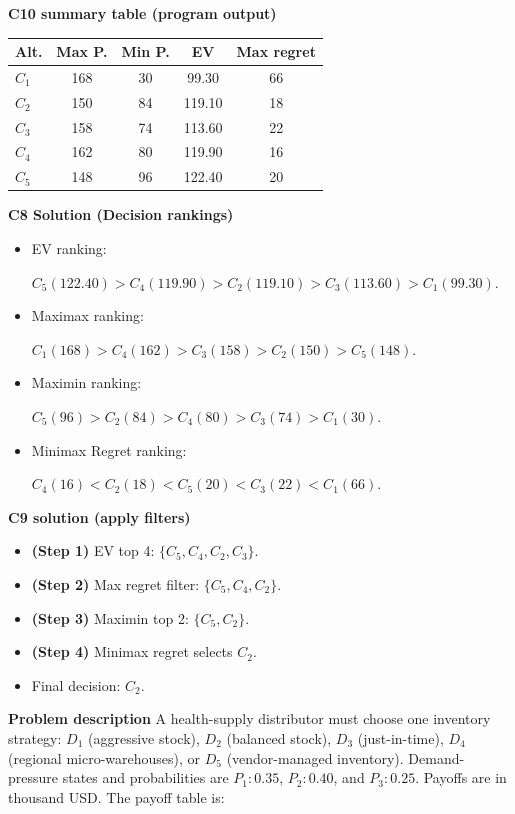 \begin{ExamProblems}
		\textbf{C10 summary table (program output)}\par
		\begin{center}
			\begin{tabular}{l c c c c}
				\hline
				Alt. & Max P. & Min P. & EV & Max regret \\
				\hline
				$C_1$ & 168 & 30 & 99.30 & 66 \\
				$C_2$ & 150 & 84 & 119.10 & 18 \\
				$C_3$ & 158 & 74 & 113.60 & 22 \\
				$C_4$ & 162 & 80 & 119.90 & 16 \\
				$C_5$ & 148 & 96 & 122.40 & 20 \\
				\hline
			\end{tabular}
		\end{center}
		
		\textbf{C8 Solution (Decision rankings)}\par
		\begin{itemize}
			\item EV ranking: \par $C_5(122.40)>C_4(119.90)>C_2(119.10)>C_3(113.60)>C_1(99.30)$.
			\item Maximax ranking:\par $C_1(168)>C_4(162)>C_3(158)>C_2(150)>C_5(148)$.
			\item Maximin ranking: \par $C_5(96)>C_2(84)>C_4(80)>C_3(74)>C_1(30)$.
			\item Minimax Regret ranking:\par $C_4(16)<C_2(18)<C_5(20)<C_3(22)<C_1(66)$.
		\end{itemize}
		
		\textbf{C9 solution (apply filters)}\par
		\begin{itemize}
			\item \textbf{(Step 1)} EV top 4: $\{C_5,C_4,C_2,C_3\}$.
			\item \textbf{(Step 2)} Max regret filter: $\{C_5,C_4,C_2\}$.
			\item \textbf{(Step 3)} Maximin top 2: $\{C_5,C_2\}$.
			\item \textbf{(Step 4)} Minimax regret selects $C_2$.
			\item Final decision: $C_2$.
		\end{itemize}
		
		\newpage
		\item
		\textbf{Problem description}
		A health-supply distributor must choose one inventory strategy: $D_1$ (aggressive stock), $D_2$ (balanced stock), $D_3$ (just-in-time), $D_4$ (regional micro-warehouses), or $D_5$ (vendor-managed inventory).
		Demand-pressure states and probabilities are $P_1:0.35$, $P_2:0.40$, and $P_3:0.25$. Payoffs are in thousand USD. The payoff table is:
		

\end{ExamProblems}
